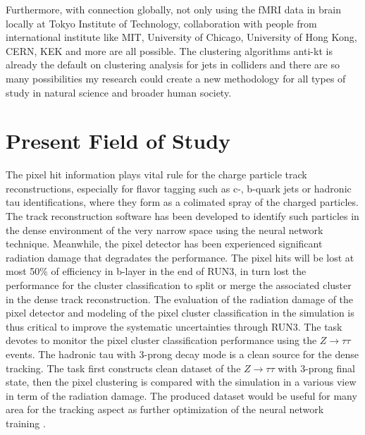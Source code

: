 \documentclass{article}
\begin{document}
Furthermore, with connection globally, not only using the fMRI data in brain locally 
at Tokyo Institute of Technology, collaboration with people from international 
institute like MIT, University of Chicago, University of Hong Kong, CERN, KEK and 
more are all possible. The clustering algorithms anti-kt is already the 
default on clustering analysis for jets in colliders and there are so 
many possibilities my research could create a new methodology for 
all types of study in natural science and broader human society. 


\section{Present Field of Study}

The pixel hit information plays vital rule for the charge particle track reconstructions,
especially for flavor tagging such as c-, b-quark jets or hadronic tau identifications, where
they form as a colimated spray of the charged particles. The track reconstruction software
has been developed to identify such particles in the dense environment of the very narrow
space using the neural network technique. Meanwhile, the pixel detector has been experienced
significant radiation damage that degradates the performance. The pixel hits will be lost at
most 50\% of efficiency in b-layer in the end of RUN3, in turn lost the performance for the
cluster classification to split or merge the associated cluster in the dense track reconstruction.
The evaluation of the radiation damage of the pixel detector and modeling of the pixel cluster
classification in the simulation is thus critical to improve the systematic uncertainties through
RUN3.
The task devotes to monitor the pixel cluster classification performance using the
$Z \rightarrow \tau \tau$ events. The hadronic tau with 3-prong decay mode is a clean source for the dense
tracking. The task first constructs clean dataset of the $Z \rightarrow \tau \tau$ with 3-prong final state, then
the pixel clustering is compared with the simulation in a various view in term of the radiation
damage. The produced dataset would be useful for many area for the tracking aspect as further
optimization of the neural network training \cite{pixel}.



\end{document}
